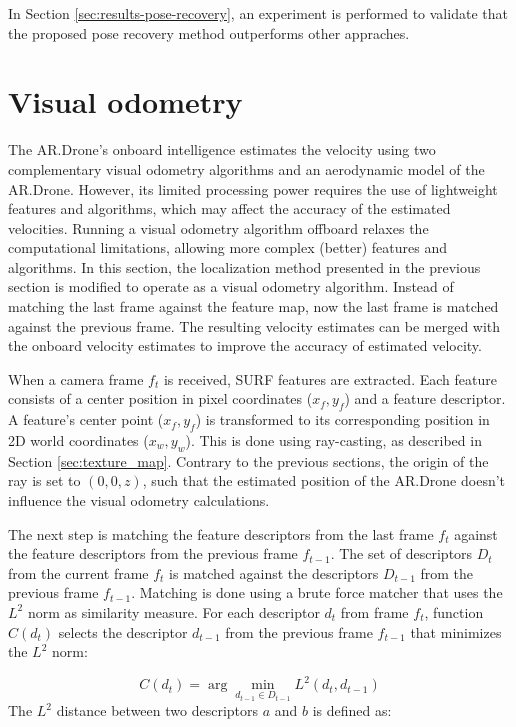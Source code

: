 In Section \ref{sec:results-pose-recovery}, an experiment is performed to validate that the proposed pose recovery method outperforms other appraches.



\section{Visual odometry}
\label{sec:visual-slam-visual-odemetry}
The AR.Drone's onboard intelligence estimates the velocity using two complementary visual odometry algorithms and an aerodynamic model of the AR.Drone.
However, its limited processing power requires the use of lightweight features and algorithms, which may affect the accuracy of the estimated velocities.
Running a visual odometry algorithm offboard relaxes the computational limitations, allowing more complex (better) features and algorithms.
In this section, the localization method presented in the previous section is modified to operate as a visual odometry algorithm.
Instead of matching the last frame against the feature map, now the last frame is matched against the previous frame.
The resulting velocity estimates can be merged with the onboard velocity estimates to improve the accuracy of estimated velocity.

When a camera frame $f_t$ is received, SURF features are extracted.
Each feature consists of a center position in pixel coordinates ($x_f, y_f$) and a feature descriptor.
A feature's center point ($x_f, y_f$) is transformed to its corresponding position in 2D world coordinates ($x_w, y_w$).
This is done using ray-casting, as described in Section \ref{sec:texture_map}.
Contrary to the previous sections, the origin of the ray is set to $(0, 0, z)$, such that the estimated position of the AR.Drone doesn't influence the visual odometry calculations.

The next step is matching the feature descriptors from the last frame $f_t$ against the feature descriptors from the previous frame $f_{t-1}$.
The set of descriptors $D_{t}$ from the current frame $f_t$ is matched against the descriptors $D_{t-1}$ from the previous frame $f_{t-1}$.
Matching is done using a brute force matcher that uses the $L^2$ norm as similarity measure.
For each descriptor $d_{t}$ from frame $f_t$, function $C(d_{t})$ selects the descriptor $d_{t-1}$ from the previous frame $f_{t-1}$ that minimizes the $L^2$ norm:

\begin{equation}
C(d_{t}) = \arg\min_{d_{t-1} \in D_{t-1}} L^2(d_t, d_{t-1})
\end{equation}
The $L^2$ distance between two descriptors $a$ and $b$ is defined as:

